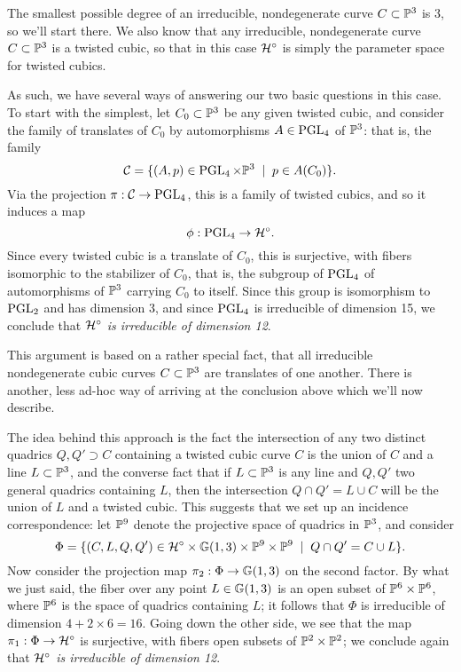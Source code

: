 The smallest possible degree of an irreducible, nondegenerate curve $C \subset \PP^3$ is 3, so we'll start there. We also know that any irreducible, nondegenerate curve $C \subset \PP^3$ is a twisted cubic, so that in this case $\cH^\circ$ is simply the parameter space for twisted cubics.

As such, we have several ways of answering our two basic questions in this case. To start with the simplest, let $C_0 \subset \PP^3$ be any given twisted cubic, and consider the family of translates of $C_0$ by automorphisms $A \in \PGL_4$ of $\PP^3$: that is, the family
$$
\cC = \{ (A, p) \in \PGL_4 \times \PP^3 \; \mid \; p \in A(C_0) \}.
$$
Via the projection $\pi : \cC \to \PGL_4$, this is a family of twisted cubics, and so it induces a map
$$
\phi : \PGL_4 \to \cH^\circ.
$$
Since every twisted cubic is a translate of $C_0$, this is surjective, with fibers isomorphic to the stabilizer of $C_0$, that is, the subgroup of $\PGL_4$ of automorphisms of $\PP^3$ carrying $C_0$ to itself. Since this group is isomorphism to $\PGL_2$ and has dimension 3, and since $\PGL_4$ is irreducible of dimension 15, we conclude that \emph{$\cH^\circ$ is irreducible of dimension 12}.

This argument is based on a rather special fact, that all irreducible nondegenerate cubic curves $C \subset \PP^3$ are translates of one another. There is another, less ad-hoc way of arriving at the conclusion above which we'll now describe. 

The idea behind this approach is the fact the intersection of any two distinct quadrics $Q, Q' \supset C$ containing a twisted cubic curve $C$ is the union of $C$ and a line $L \subset \PP^3$, and the converse fact that if $L \subset \PP^3$ is any line and $Q, Q'$ two general quadrics containing $L$, then the intersection $Q \cap Q' = L \cup C$ will be the union of $L$ and a twisted cubic. This suggests that we set up an incidence correspondence: let $\PP^9$ denote the projective space of quadrics in $\PP^3$, and consider
$$
\Phi = \{ (C, L, Q, Q') \in \cH^\circ \times \GG(1,3) \times \PP^9 \times \PP^9 \; \mid \; Q \cap Q' = C \cup L \}.
$$
Now consider the projection map $\pi_2 : \Phi \to \GG(1,3)$ on the second factor. By what we just said, the fiber over any point $L \in \GG(1,3)$ is an open subset of $\PP^6 \times \PP^6$, where $\PP^6$ is the space of quadrics containing $L$; it follows that $\Phi$ is irreducible of dimension $4 + 2\times 6 = 16$. Going down the other side, we see that the map $\pi_1 : \Phi \to \cH^\circ$ is surjective, with fibers open subsets of $\PP^2 \times \PP^2$; we conclude again that \emph{$\cH^\circ$ is irreducible of dimension 12}.

